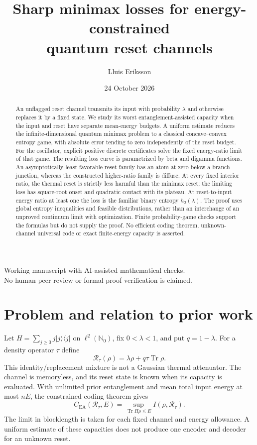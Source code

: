 \documentclass[11pt]{article}
\title{Sharp minimax losses for energy-constrained\\quantum reset channels}
\author{Lluis Eriksson}
\date{24 October 2026}
\DeclareMathOperator{\Tr}{Tr}
\newcommand{\R}{\mathcal R}
\newcommand{\CE}{C_{\mathrm{EA}}}
\begin{document}
\maketitle
\begin{center}\small Working manuscript with AI-assisted mathematical checks.\\No human peer review or formal proof verification is claimed.\end{center}
\begin{abstract}
An unflagged reset channel transmits its input with probability $\lambda$ and otherwise replaces it by a fixed state. We study its worst entanglement-assisted capacity when the input and reset have separate mean-energy budgets. A uniform estimate reduces the infinite-dimensional quantum minimax problem to a classical concave--convex entropy game, with absolute error tending to zero independently of the reset budget. For the oscillator, explicit positive discrete certificates solve the fixed energy-ratio limit of that game. The resulting loss curve is parametrized by beta and digamma functions. An asymptotically least-favorable reset family has an atom at zero below a branch junction, whereas the constructed higher-ratio family is diffuse. At every fixed interior ratio, the thermal reset is strictly less harmful than the minimax reset; the limiting loss has square-root onset and quadratic contact with its plateau. At reset-to-input energy ratio at least one the loss is the familiar binary entropy $h_2(\lambda)$. The proof uses global entropy inequalities and feasible distributions, rather than an interchange of an unproved continuum limit with optimization. Finite probability-game checks support the formulas but do not supply the proof. No efficient coding theorem, unknown-channel universal code or exact finite-energy capacity is asserted.
\end{abstract}

\section{Problem and relation to prior work}
Let $H=\sum_{j\ge0}j|j\rangle\langle j|$ on $\ell^2(\mathbb N_0)$, fix $0<\lambda<1$, and put $q=1-\lambda$. For a density operator $\tau$ define
\[
 \R_\tau(\rho)=\lambda\rho+q\tau\Tr\rho.
\]
This identity/replacement mixture is not a Gaussian thermal attenuator. The channel is memoryless, and its reset state is known when its capacity is evaluated. With unlimited prior entanglement and mean total input energy at most $nE$, the constrained coding theorem gives \cite[Theorem~1]{hs}
\begin{equation}\label{eq:ea}
 \CE(\R_\tau,E)=\sup_{\Tr H\rho\le E} I(\rho,\R_\tau).
\end{equation}
The limit in blocklength is taken for each fixed channel and energy allowance. A uniform estimate of these capacities does not produce one encoder and decoder for an unknown reset.
\end{document}
